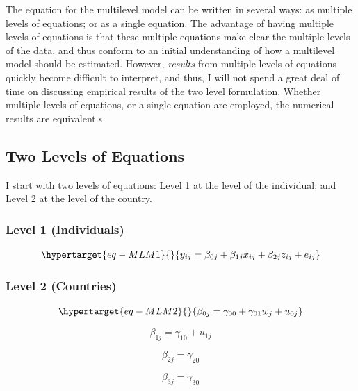 \documentclass[
  letterpaper,
  DIV=11,
  numbers=noendperiod]{scrreprt}
\begin{document}
The equation for the multilevel model can be written in several ways: as
multiple levels of equations; or as a single equation. The advantage of
having multiple levels of equations is that these multiple equations
make clear the multiple levels of the data, and thus conform to an
initial understanding of how a multilevel model should be estimated.
However, \emph{results} from multiple levels of equations quickly become
difficult to interpret, and thus, I will not spend a great deal of time
on discussing empirical results of the two level formulation. Whether
multiple levels of equations, or a single equation are employed, the
numerical results are equivalent.s

\hypertarget{two-levels-of-equations}{%
\subsection{Two Levels of Equations}\label{two-levels-of-equations}}

I start with two levels of equations: Level 1 at the level of the
individual; and Level 2 at the level of the country.

\hypertarget{level-1-individuals}{%
\subsubsection{Level 1 (Individuals)}\label{level-1-individuals}}

\begin{equation}\protect\hypertarget{eq-MLM1}{}{y_{ij} = \beta_{0j} + \beta_{1j} x_{ij} + \beta_{2j} z_{ij} + e_{ij}}\label{eq-MLM1}\end{equation}

\hypertarget{level-2-countries}{%
\subsubsection{Level 2 (Countries)}\label{level-2-countries}}

\begin{equation}\protect\hypertarget{eq-MLM2}{}{\beta_{0j} = \gamma_{00} +\gamma_{01} w_j + u_{0j}}\label{eq-MLM2}\end{equation}

\[\beta_{1j} = \gamma_{10} + u_{1j}\]

\[\beta_{2j} = \gamma_{20}\]

\[\beta_{3j} = \gamma_{30}\]
\end{document}
